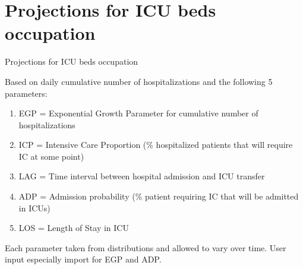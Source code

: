 \documentclass[t,9pt,xcolor=dvipsnames]{beamer}              %
\begin{document}
\section{Projections for ICU beds occupation}

\begin{frame}{Projections for ICU beds occupation}

Based on daily \alert{cumulative number of hospitalizations} and the following 5 parameters:

\begin{enumerate}
\item \alert{EGP} = Exponential Growth Parameter for cumulative number of hospitalizations
\bigskip

\item \alert{ICP} = Intensive Care Proportion (\% hospitalized patients that will require IC at some point)
\bigskip

\item \alert{LAG} = Time interval between hospital admission and ICU transfer
\bigskip

\item \alert{ADP} = Admission probability (\% patient requiring IC that will be admitted in ICUs)
\bigskip

\item \alert{LOS} = Length of Stay in ICU
\end{enumerate}

Each parameter taken from distributions and allowed to vary over time. User input especially import for EGP and ADP.

\end{frame}
\end{document}
